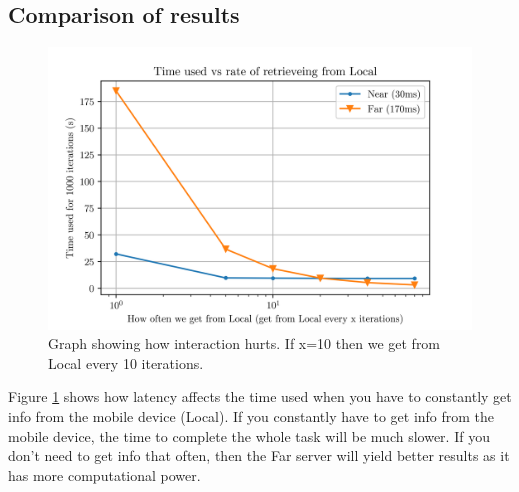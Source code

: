 \subsection{Comparison of results}
\begin{figure}[t]
    \centering
    \includegraphics[scale=1]{chapters/evaluation/figures/times.png}
    \caption{Graph showing how interaction hurts. If x=10 then we get from Local every 10 iterations.}
    \label{fig:time_graph_near_far}
\end{figure}

Figure \ref{fig:time_graph_near_far} shows how latency affects the time used when you have to constantly get info from the mobile device (Local). If you constantly have to get info from the mobile device, the time to complete the whole task will be much slower. If you don't need to get info that often, then the Far server will yield better results as it has more computational power.



